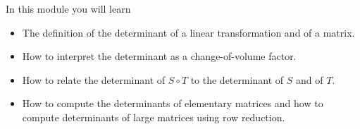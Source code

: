 \documentclass{problemset}
\begin{document}
\begin{module}

	In this module you will learn
	\begin{itemize}
		\item The definition of the determinant of a linear transformation and of a matrix.
		\item How to interpret the determinant as a change-of-volume factor.
		\item How to relate the determinant of $S\circ T$ to the determinant of $S$ and
			of $T$.
		\item How to compute the determinants of elementary matrices and how to compute determinants
			of large matrices using row reduction.
	\end{itemize}

	
\end{module}
\end{document}
